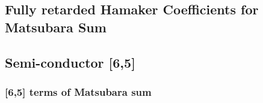 \documentclass[a4paper]{article}
\begin{document}
\begin{center}
%
%
%


\chapter{Fully retarded Hamaker Coefficients for Matsubara Sum}
\section{Semi-conductor [6,5]}
\subsection{[6,5] terms of Matsubara sum}


\end{center}
\end{document}
